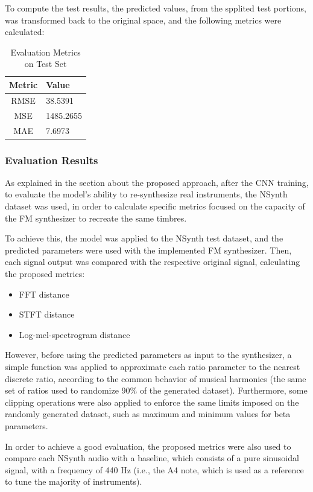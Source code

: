 \documentclass[sigconf,natbib=false]{acmart}
\begin{document}
To compute the test results, the predicted values, from the spplited test portions, was transformed back to the original space, and the following metrics were calculated:

\begin{table}
  \caption{Evaluation Metrics on Test Set}
  \label{tab:test_metrics}
  \begin{tabular}{cl}
    \toprule
    Metric & Value \\
    \midrule
    RMSE & 38.5391 \\
    MSE  & 1485.2655 \\
    MAE  & 7.6973 \\
    \bottomrule
  \end{tabular}
\end{table}

\subsubsection{Evaluation Results}

As explained in the section about the proposed approach, after the CNN training, to evaluate the model's ability to re-synthesize real instruments, the NSynth dataset was used, in order to calculate specific metrics focused on the capacity of the FM synthesizer to recreate the same timbres.

To achieve this, the model was applied to the NSynth test dataset, and the predicted parameters were used with the implemented FM synthesizer. Then, each signal output was compared with the respective original signal, calculating the proposed metrics:

\begin{itemize}
  \item FFT distance
  \item STFT distance
  \item Log-mel-spectrogram distance
\end{itemize}

However, before using the predicted parameters as input to the synthesizer, a simple function was applied to approximate each ratio parameter to the nearest discrete ratio, according to the common behavior of musical harmonics (the same set of ratios used to randomize 90\% of the generated dataset). Furthermore, some clipping operations were also applied to enforce the same limits imposed on the randomly generated dataset, such as maximum and minimum values for beta parameters.

In order to achieve a good evaluation, the proposed metrics were also used to compare each NSynth audio with a baseline, which consists of a pure sinusoidal signal, with a frequency of 440 Hz (i.e., the A4 note, which is used as a reference to tune the majority of instruments).
\end{document}
